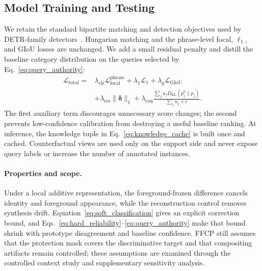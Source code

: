 \subsection{Model Training and Testing}
\label{sec:training}

We retain the standard bipartite matching and detection objectives used by
DETR-family detectors~\cite{detr,dino,groundingdino}. Hungarian matching and
the phrase-level focal, $\ell_1$, and GIoU losses are unchanged. We add a
small residual penalty and distill the baseline category distribution on the
queries selected by Eq.~\eqref{eq:query_authority}:
\begin{equation}
\begin{aligned}
\mathcal L_{\mathrm{total}}={}&
\lambda_{\mathrm{cls}}\mathcal L_{\mathrm{focal}}^{\mathrm{phrase}}
+\lambda_1\mathcal L_1
+\lambda_g\mathcal L_{\mathrm{GIoU}}\\
&+\lambda_{\mathrm{res}}\|\boldsymbol\delta\|_1
+\lambda_{\mathrm{con}}
\frac{\sum_j u_jD_{\mathrm{KL}}(p_j^0\|p_j)}
{\sum_j u_j+\epsilon}.
\end{aligned}
\label{eq:total_loss}
\end{equation}
The first auxiliary term discourages unnecessary score changes; the second
prevents low-confidence calibration from destroying a useful baseline
ranking. At inference, the knowledge tuple in
Eq.~\eqref{eq:knowledge_cache} is built once and cached. Counterfactual views
are used only on the support side and never expose query labels or increase
the number of annotated instances.

\paragraph{Properties and scope.}
Under a local additive representation, the foreground-frozen difference
cancels identity and foreground appearance, while the reconstruction control
removes synthesis drift. Equation~\eqref{eq:soft_classification} gives an
explicit correction bound, and Eqs.~\eqref{eq:hard_reliability}--\eqref{eq:query_authority}
make that bound shrink with prototype disagreement and baseline confidence.
FFCP still assumes that the protection mask covers the discriminative target
and that compositing artifacts remain controlled; these assumptions are
examined through the controlled context study and supplementary sensitivity
analysis.
